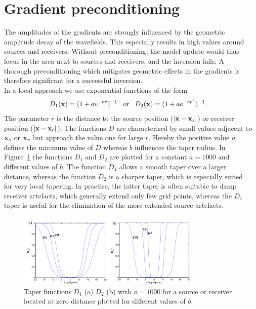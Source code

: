 \section{Gradient preconditioning}\label{sec:preconditioning}
The amplitudes of the gradients are strongly influenced by the geometric amplitude decay of the wavefields. This especially results in high values around sources and receivers. Without preconditioning, the model update would thus focus in the area next to sources and receivers, and the inversion fails. A thorough preconditioning which mitigates geometric effects in the gradients is therefore significant for a successful inversion.\\
In a local approach we use  exponential functions of the form 
\begin{equation} D_1(\textbf x)=(1+ae^{-br})^{-1} \hspace{0.3cm}\text{or}\hspace{0.3cm} D_2(\textbf x)=(1+ae^{-br^2})^{-1}.\end{equation} The parameter $r$ is the distance to the source position ($|\textbf x-\textbf x_s|$) or receiver position ($|\textbf x-\textbf x_r|$). The functions $D$ are characterised by small values adjacent to $\textbf x_s$ or $\textbf x_r$ but approach the value one for large $r$. Hereby the positive value $a$ defines the minimum value of $D$ whereas $b$ influences the taper radius. In Figure~\ref{fig:taper} the functions $D_1$ and $D_2$ are plotted for a constant $a=1000$ and different values of $b$. The function $D_1$ allows a smooth taper over a larger distance, whereas the function $D_2$ is a sharper taper, which is especially suited for very local tapering. In practise, the latter taper is often suitable to damp receiver artefacts, which generally extend only few grid points, whereas the $D_1$ taper is useful for the elimination of the more extended source artefacts.\\
\begin{figure}[h!]
\includegraphics[width=0.8\textwidth]{fig/taper}
\caption[Exemplary taper functions for preconditioning]{Taper functions $D_1$ (a) $D_2$ (b)  with $a=1000$ for a source or receiver located at zero distance plotted for different values of $b$. }\label{fig:taper}
\end{figure}
